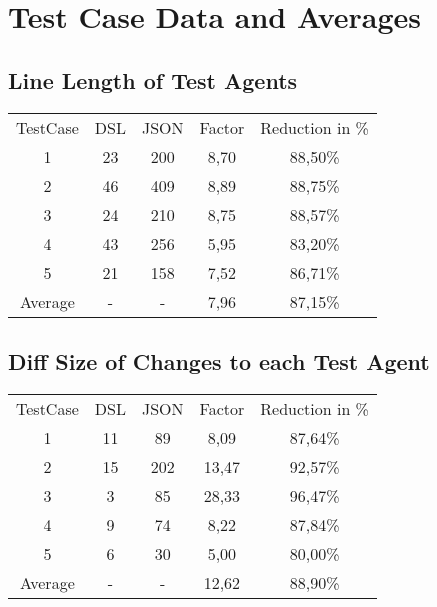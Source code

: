 \chapter{Test Case Data and Averages}
\label{ResultTables}

\section{Line Length of Test Agents}
\begin{tabular}{ccccc}
    TestCase & DSL & JSON & Factor & Reduction in \% \\
    1 & 23 & 200 & 8,70 & 88,50\% \\
    2 & 46 & 409 & 8,89 & 88,75\% \\
    3 & 24 & 210 & 8,75 & 88,57\% \\
    4 & 43 & 256 & 5,95 & 83,20\% \\
    5 & 21 & 158 & 7,52 & 86,71\% \\
    Average & - & - & 7,96 & 87,15\% \\
\end{tabular}
    

\section{Diff Size of Changes to each Test Agent}
\begin{tabular}{ccccc}
    TestCase & DSL & JSON & Factor & Reduction in \% \\
    1 & 11 & 89 & 8,09 & 87,64\% \\
    2 & 15 & 202 & 13,47 & 92,57\% \\
    3 & 3 & 85 & 28,33 & 96,47\% \\
    4 & 9 & 74 & 8,22 & 87,84\% \\
    5 & 6 & 30 & 5,00 & 80,00\% \\
    Average & - & - & 12,62 & 88,90\% \\
\end{tabular}